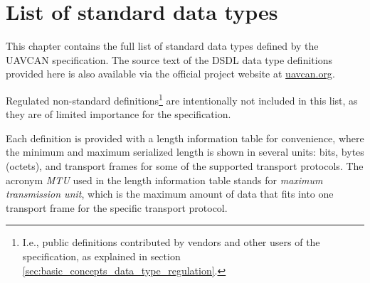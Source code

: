 \chapter{List of standard data types}

This chapter contains the full list of standard data types defined by the UAVCAN specification.
The source text of the DSDL data type definitions provided here is also available via the
official project website at \href{http://uavcan.org}{uavcan.org}.

Regulated non-standard definitions\footnote{I.e., public definitions contributed by vendors and other users
of the specification, as explained in section \ref{sec:basic_concepts_data_type_regulation}.}
are intentionally not included in this list, as they are of limited importance for the specification.

Each definition is provided with a length information table for convenience,
where the minimum and maximum serialized length is shown in several units:
bits, bytes (octets), and transport frames for some of the supported transport protocols.
The acronym \emph{MTU} used in the length information table stands for
\emph{maximum transmission unit}, which is the maximum amount of data that fits into one
transport frame for the specific transport protocol.

